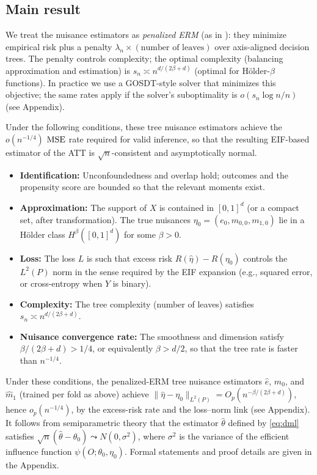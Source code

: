 \documentclass[12pt]{article}
\begin{document}
\subsection{Main result}

We treat the nuisance estimators as \emph{penalized ERM} (as in \citet{xuStatisticalOptimalityOptimal2026}): they minimize empirical risk plus a penalty $\lambda_n \times (\text{number of leaves})$ over axis-aligned decision trees. The penalty controls complexity; the optimal complexity (balancing approximation and estimation) is $s_n \asymp n^{d/(2\beta+d)}$ (optimal for Hölder-$\beta$ functions). In practice we use a GOSDT-style solver that minimizes this objective; the same rates apply if the solver's suboptimality is $o(s_n \log n / n)$ (see Appendix).

Under the following conditions, these tree nuisance estimators achieve the $o(n^{-1/4})$ $\operatorname{MSE}$ rate required for valid inference, so that the resulting EIF-based estimator of the ATT is $\sqrt{n}$-consistent and asymptotically normal.

\begin{itemize}
\item \textbf{Identification:} Unconfoundedness and overlap hold; outcomes and the propensity score are bounded so that the relevant moments exist.
\item \textbf{Approximation:} The support of $X$ is contained in $[0,1]^d$ (or a compact set, after transformation). The true nuisances $\eta_0 = (e_0, m_{0,0}, m_{1,0})$ lie in a H\"older class $H^\beta([0,1]^d)$ for some $\beta > 0$.
\item \textbf{Loss:} The loss $L$ is such that excess risk $R(\hat\eta) - R(\eta_0)$ controls the $L^2(P)$ norm in the sense required by the EIF expansion (e.g., squared error, or cross-entropy when $Y$ is binary).
\item \textbf{Complexity:} The tree complexity (number of leaves) satisfies $s_n \asymp n^{d/(2\beta+d)}$.
\item \textbf{Nuisance convergence rate:} The smoothness and dimension satisfy $\beta/(2\beta+d) > 1/4$, or equivalently $\beta > d/2$, so that the tree rate is faster than $n^{-1/4}$.
\end{itemize}
Under these conditions, the penalized-ERM tree nuisance estimators $\hat{e}$, $\hat{m}_0$, and $\hat{m}_1$ (trained per fold as above) achieve $\|\hat\eta - \eta_0\|_{L^2(P)} = O_p(n^{-\beta/(2\beta+d)})$, hence $o_p(n^{-1/4})$, by the excess-risk rate and the loss--norm link (see Appendix). It follows from semiparametric theory \citep{chernozhukov2018} that the estimator $\hat\theta$ defined by \eqref{eq:dml} satisfies $\sqrt{n}(\hat\theta - \theta_0) \leadsto N(0, \sigma^2)$, where $\sigma^2$ is the variance of the efficient influence function $\psi(O; \theta_0, \eta_0)$. Formal statements and proof details are given in the Appendix.
\end{document}
